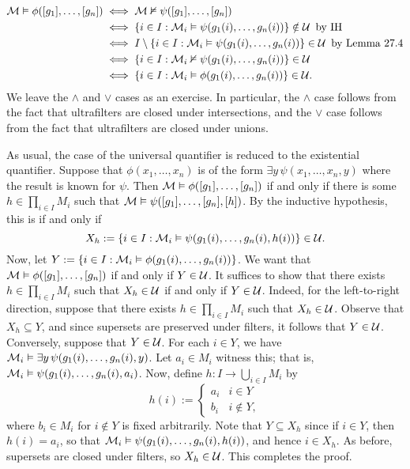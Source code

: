 \documentclass[10pt]{article}
\makeatletter
\theoremstyle{newstyle}
\newenvironment{pf}[1][\proofname]{\par
  \pushQED{\qed}%
  \normalfont \topsep0\p@\relax
  \trivlist
  \item[\hskip\labelsep\scshape
  #1\@addpunct{.}]\ignorespaces
}{%
  \popQED\endtrivlist\@endpefalse
}
\makeatother
\begin{document}
\begin{pf}
\begin{align*}
    {\cal M} \vDash \phi([g_1], \dots, [g_n]) 
    &\iff {\cal M} \nvDash \psi([g_1], \dots, [g_n]) \\
    &\iff \{i \in I : {\cal M}_i \vDash \psi(g_1(i), \dots, g_n(i))\} 
    \notin {\cal U} \, \text{ by IH} \\
    &\iff I \setminus \{i \in I : {\cal M}_i \vDash \psi(g_1(i), \dots, g_n(i))\} \in {\cal U}
    \, \text{ by Lemma 27.4} \\
    &\iff \{i \in I : {\cal M}_i \nvDash \psi(g_1(i), \dots, g_n(i))\} \in {\cal U} \\ 
    &\iff \{i \in I : {\cal M}_i \vDash \phi(g_1(i), \dots, g_n(i))\} \in {\cal U}.
\end{align*}
We leave the $\wedge$ and $\vee$ cases as an exercise. In particular, the 
$\wedge$ case follows from the fact that ultrafilters are closed under intersections, 
and the $\vee$ case follows from the fact that ultrafilters are closed under unions.

As usual, the case of the universal quantifier is reduced to the existential quantifier. 
Suppose that $\phi(x_1, \dots, x_n)$ is of the form 
$\exists y \, \psi(x_1, \dots, x_n, y)$ where the result is known for $\psi$. 
Then ${\cal M} \vDash \phi([g_1], \dots, [g_n])$ if and only if there is some 
$h \in \prod_{i \in I} M_i$ such that ${\cal M} \vDash \psi([g_1], \dots, [g_n], [h])$. 
By the inductive hypothesis, this is if and only if 
\[ X_h := \{i \in I : {\cal M}_i \vDash \psi(g_1(i), \dots, g_n(i), h(i)) \} \in {\cal U}. \] 
Now, let $Y := \{i \in I : {\cal M}_i \vDash \phi(g_1(i), \dots, g_n(i))\}$. 
We want that ${\cal M} \vDash \phi([g_1], \dots, [g_n])$ if and only if $Y \in {\cal U}$. 
It suffices to show that there exists $h \in \prod_{i \in I} M_i$ such that $X_h \in {\cal U}$ 
if and only if $Y \in {\cal U}$. Indeed, for the left-to-right direction, 
suppose that there exists $h \in \prod_{i \in I} M_i$ such that $X_h \in {\cal U}$. 
Observe that $X_h \subseteq Y$, and since supersets are preserved under filters, 
it follows that $Y \in {\cal U}$. Conversely, suppose that $Y \in {\cal U}$. 
For each $i \in Y$, we have ${\cal M}_i \vDash \exists y \, \psi(g_1(i), \dots, g_n(i), y)$. 
Let $a_i \in M_i$ witness this; that is, ${\cal M}_i \vDash \psi(g_1(i), \dots, g_n(i), a_i)$.
Now, define $h : I \to \bigcup_{i \in I} M_i$ by 
\[ h(i) := \begin{cases} a_i & i \in Y \\ b_i & i \notin Y, \end{cases} \]
where $b_i \in M_i$ for $i \notin Y$ is fixed arbitrarily. Note that $Y \subseteq X_h$ 
since if $i \in Y$, then $h(i) = a_i$, so that ${\cal M}_i \vDash \psi(g_1(i), \dots, g_n(i), 
h(i))$, and hence $i \in X_h$. As before, supersets are closed under filters, so $X_h 
\in {\cal U}$. This completes the proof.
\end{pf}
\end{document}
